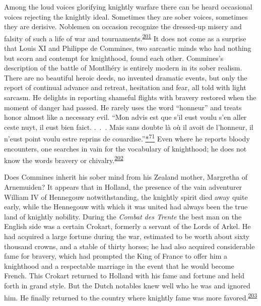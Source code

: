 Among the loud voices glorifying knightly warfare there can be heard
occasional voices rejecting the knightly ideal. Sometimes they are sober
voices, sometimes they are derisive. Noblemen on occasion recognize the
dressed-up misery and falsity of such a life of war and
tournaments.\textsuperscript{\protect\hypertarget{10_Chapter_Three__THE_HEROIC_DREAM.xhtmlux5cux23id_1535}{\protect\hyperlink{23_NOTES.xhtmlux5cux23id_1536}{201}}}
It does not come as a surprise that Louis XI and Philippe de Commines,
two sarcastic minds who had nothing but scorn and contempt for
knighthood, found each other. Commines's description of the battle of
Montlhéry is entirely
mod\protect\hypertarget{10_Chapter_Three__THE_HEROIC_DREAM.xhtmlux5cux23page_118}{}{}ern
in its sober realism. There are no beautiful heroic deeds, no invented
dramatic events, but only the report of continual advance and retreat,
hesitation and fear, all told with light sarcasm. He delights in
reporting shameful flights with bravery restored when the moment of
danger had passed. He rarely uses the word ``honneur'' and treats honor
almost like a necessary evil. ``Mon advis est que s'il eust voulu s'en
aller ceste nuyt, il eust bien faict. .~.~. Mais sans doubte là où il
avoit de l'honneur, il n'eust point voulu estre reprins de
couardise.''\protect\hypertarget{10_Chapter_Three__THE_HEROIC_DREAM.xhtmlux5cux23id_3081}{\protect\hyperlink{23_NOTES.xhtmlux5cux23id_3082}{*\textsuperscript{71}}}
Even where he reports bloody encounters, one searches in vain for the
vocabulary of knighthood; he does not know the words bravery or
chivalry.\textsuperscript{\protect\hypertarget{10_Chapter_Three__THE_HEROIC_DREAM.xhtmlux5cux23id_1533}{\protect\hyperlink{23_NOTES.xhtmlux5cux23id_1534}{202}}}

Does Commines inherit his sober mind from his Zealand mother, Margretha
of Arnemuiden? It appears that in Holland, the presence of the vain
adventurer William IV of Hennegouw notwithstanding, the knightly spirit
died away quite early, while the Hennegouw with which it was united had
always been the true land of knightly nobility. During the \emph{Combat
des Trente} the best man on the English side was a certain Crokart,
formerly a servant of the Lords of Arkel. He had acquired a large
fortune during the war, estimated to be worth about sixty thousand
crowns, and a stable of thirty horses; he had also acquired considerable
fame for bravery, which had prompted the King of France to offer him a
knighthood and a respectable marriage in the event that he would become
French. This Crokart returned to Holland with his fame and fortune and
held forth in grand style. But the Dutch notables knew well who he was
and ignored him. He finally returned to the country where knightly fame
was more
favored.\textsuperscript{\protect\hypertarget{10_Chapter_Three__THE_HEROIC_DREAM.xhtmlux5cux23id_1531}{\protect\hyperlink{23_NOTES.xhtmlux5cux23id_1532}{203}}}

